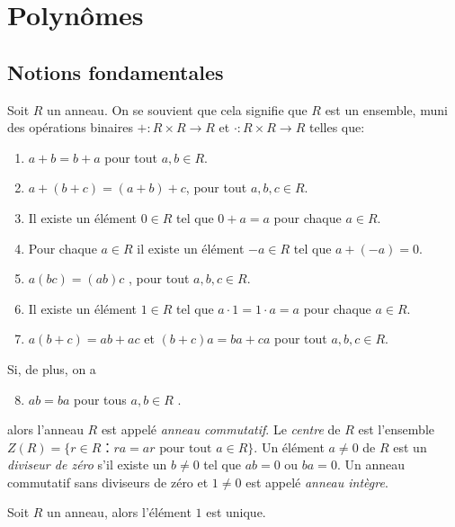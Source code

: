 \chapter{Polynômes}
\label{cha:polynomes}

\section{Notions fondamentales}
\label{sec:noti-fond}


Soit $R$ un anneau. On se souvient que cela signifie que  $R$ est un ensemble,  muni des opérations binaires  $+ : R × R → R$  et $⋅: R × R → R$ telles que: 
\begin{enumerate}[(R1)]
\item $a+ b  = b+a$ pour tout     $a,b ∈ R$. \label{R1}
\item $a + (b+c) = (a + b) +c$, pour tout $a ,b,c ∈ R$. \label{R2}
\item Il existe un élément $0 ∈R$ tel que $0+a =a$ pour chaque $a ∈R$. \label{R3}
\item Pour chaque $a ∈R$ il existe un élément $-a ∈R$ tel que $a + (-a) = 0$. \label{R4}
\item $a(bc) = (ab) c$ , pour tout $a,b,c ∈ R$. \label{R5}
\item Il existe un élément $1 ∈R$ tel que $a ⋅ 1 = 1 ⋅a = a$ pour chaque $a ∈R$. \label{R6}
\item $a (b+c) = ab + ac$ et $(b+c) a =ba +ca$  pour tout $a,b,c ∈R$.\label{R7} 
\end{enumerate}
Si, de plus, on a 
\begin{enumerate}[(R1)]
  \setcounter{enumi}{7} 
\item  $a b = ba$ pour tous $a,b ∈R$ \label{R8}. 
\end{enumerate}
alors l'anneau $R$ est appelé \emph{anneau commutatif}. Le \emph{centre} de $R$ est l'ensemble $Z(R) = \{ r ∈ R ： ra = ar \text{ pour tout } a ∈ R\}$. 
Un élément  $a ≠0$ de $R$ est un \emph{diviseur de zéro} s'il existe un $b≠0$ tel que $ab = 0$ ou $ba = 0$. Un anneau commutatif sans diviseurs de zéro et $1 ≠0$  est appelé \emph{anneau intègre}.  



\begin{exercise}
  Soit $R$ un anneau, alors l'élément $1$ est unique. 
\end{exercise}



